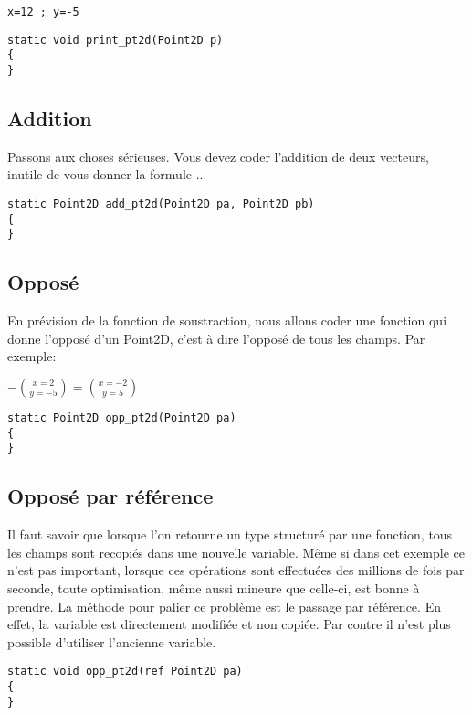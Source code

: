\documentclass[12pt,a4paper]{report}
\begin{document}
\begin{verbatim}
x=12 ; y=-5
\end{verbatim}

\begin{lstlisting}
static void print_pt2d(Point2D p)
{
}
\end{lstlisting}
\subsection{Addition}
Passons aux choses sérieuses. Vous devez coder l’addition de deux vecteurs,
inutile de vous donner la formule ...
\begin{lstlisting}
static Point2D add_pt2d(Point2D pa, Point2D pb)
{
}
\end{lstlisting}
\subsection{Opposé}
En prévision de la fonction de soustraction, nous allons coder une fonction
qui donne l’opposé d’un Point2D, c’est à dire l’opposé de tous les champs.
Par exemple:
\begin{center}
\begin{math}
-{x = 2 \choose y = -5} = {x = -2 \choose y = 5}
\end{math}
\end{center}
\begin{lstlisting}
static Point2D opp_pt2d(Point2D pa)
{
}
\end{lstlisting}
\subsection{Opposé par référence}
Il faut savoir que lorsque l’on retourne un type structuré par une fonction,
tous les champs sont recopiés dans une nouvelle variable. Même si dans cet
exemple ce n’est pas important, lorsque ces opérations sont effectuées des
millions de fois par seconde, toute optimisation, même aussi mineure que
celle-ci, est bonne à prendre.
La méthode pour palier ce problème est le passage par référence. En effet,
la variable est directement modifiée et non copiée. Par contre il n’est plus
possible d’utiliser l’ancienne variable.

\begin{lstlisting}
static void opp_pt2d(ref Point2D pa)
{
}
\end{lstlisting}
\end{document}
